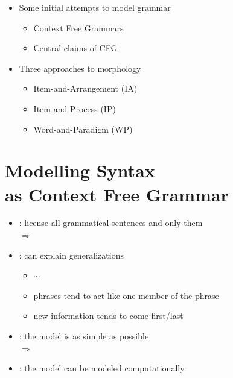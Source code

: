 \documentclass[a4paper,landscape,headrule,footrule]{foils}
\begin{document}
\maketitle
%


\begin{itemize}
\item Some initial attempts to model grammar
  \begin{itemize}
  \item Context Free Grammars
  \item Central claims of CFG
  \end{itemize}
\item Three approaches to morphology
  \begin{itemize}
  \item Item-and-Arrangement (IA) 
  \item Item-and-Process (IP)
  \item Word-and-Paradigm (WP)
  \end{itemize}
\end{itemize}

\section{Modelling Syntax \\ as Context Free Grammar}

\begin{itemize}\addtolength{\itemsep}{-1ex}
\item {}: license all grammatical sentences and only them
\\ $\Rightarrow$ 
\item {}: can explain generalizations
  \begin{itemize}
  \item  {} $\sim$  
  \item phrases tend to act like one member of the phrase 
  \item new information tends to come first/last 
  \end{itemize}
\item {}: the model is as simple as possible 
\\ $\Rightarrow$  
\item {}: the model can be modeled computationally
\end{itemize}
\end{document}
